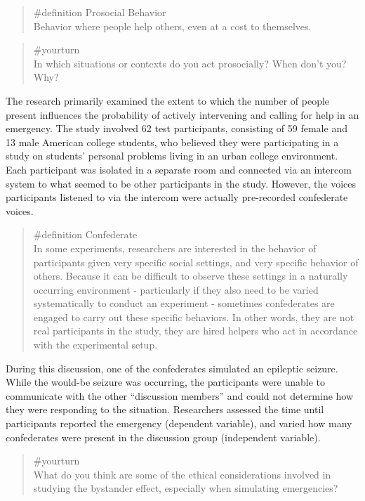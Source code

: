 \documentclass[
  letterpaper,
]{book}
\begin{document}
\begin{quote}
\label{def-prosocialbehavior}{\#definition} Prosocial
Behavior\\
Behavior where people help others, even at a cost to themselves.
\end{quote}

\begin{quote}
{\#yourturn}\\
In which situations or contexts do you act prosocially? When don't you?
Why?
\end{quote}

The research primarily examined the extent to which the number of people
present influences the probability of actively intervening and calling
for help in an emergency. The study involved 62 test participants,
consisting of 59 female and 13 male American college students, who
believed they were participating in a study on students' personal
problems living in an urban college environment. Each participant was
isolated in a separate room and connected via an intercom system to what
seemed to be other participants in the study. However, the voices
participants listened to via the intercom were actually pre-recorded
confederate voices.

\begin{quote}
\label{def-confederate}{\#definition} Confederate\\
In some experiments, researchers are interested in the behavior of
participants given very specific social settings, and very specific
behavior of others. Because it can be difficult to observe these
settings in a naturally occurring environment - particularly if they
also need to be varied systematically to conduct an experiment -
sometimes confederates are engaged to carry out these specific
behaviors. In other words, they are not real participants in the study,
they are hired helpers who act in accordance with the experimental
setup.
\end{quote}

During this discussion, one of the confederates simulated an epileptic
seizure. While the would-be seizure was occurring, the participants were
unable to communicate with the other ``discussion members'' and could
not determine how they were responding to the situation. Researchers
assessed the time until participants reported the emergency (dependent
variable), and varied how many confederates were present in the
discussion group (independent variable).

\begin{quote}
{\#yourturn}\\
What do you think are some of the ethical considerations involved in
studying the bystander effect, especially when simulating emergencies?
\end{quote}
\end{document}
